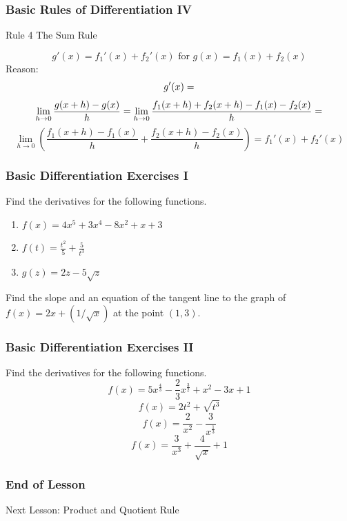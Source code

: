 \documentclass[xcolor=dvipsnames]{beamer}
\begin{document}
\begin{frame}
  \frametitle{Basic Rules of Differentiation IV}
  \begin{block}{Rule 4}
The Sum Rule
  \end{block}
\begin{equation}
  \label{eq:oubajaez}
g'(x)=f_{1}'(x)+f_{2}'(x)\mbox{ for }g(x)=f_{1}(x)+f_{2}(x)
\end{equation}
Reason:
\begin{equation}
  \label{eq:heyanaci}
g'(x)=\notag
\end{equation}
\begin{equation}
  \label{eq:bahgosio}
\lim_{h\rightarrow{}0}\frac{g(x+h)-g(x)}{h}=\lim_{h\rightarrow{}0}\frac{f_{1}(x+h)+f_{2}(x+h)-f_{1}(x)-f_{2}(x)}{h}=\notag
\end{equation}
\begin{equation}
  \label{eq:eceishie}
\lim_{h\rightarrow{}0}\left(\frac{f_{1}(x+h)-f_{1}(x)}{h}+\frac{f_{2}(x+h)-f_{2}(x)}{h}\right)=f_{1}'(x)+f_{2}'(x)
\end{equation}
\end{frame}

\begin{frame}
  \frametitle{Basic Differentiation Exercises I}
Find the derivatives for the following functions.
\begin{enumerate}
\item $f(x)=4x^{5}+3x^{4}-8x^{2}+x+3$
\item $f(t)=\frac{t^{2}}{5}+\frac{5}{t^{3}}$
\item $g(z)=2z-5\sqrt{z}$
\end{enumerate}

\bigskip

Find the slope and an equation of the tangent line to the graph of
$f(x)=2x+(1/\sqrt{x})$ at the point $(1,3)$.
\end{frame}

\begin{frame}
  \frametitle{Basic Differentiation Exercises II}
Find the derivatives for the following functions.
\begin{equation}
  \label{eq:ohzahcer}
  f(x)=5x^{\frac{4}{3}}-\frac{2}{3}x^{\frac{3}{2}}+x^{2}-3x+1
\end{equation}
\begin{equation}
  \label{eq:mothoofi}
f(x)=2t^{2}+\sqrt{t^{3}}
\end{equation}
\begin{equation}
  \label{eq:aiquooyo}
  f(x)=\frac{2}{x^{2}}-\frac{3}{x^{\frac{1}{3}}}
\end{equation}
\begin{equation}
  \label{eq:achaingo}
f(x)=\frac{3}{x^{3}}+\frac{4}{\sqrt{x}}+1
\end{equation}
\end{frame}

\begin{frame}
  \frametitle{End of Lesson}
Next Lesson: Product and Quotient Rule
\end{frame}
\end{document}
